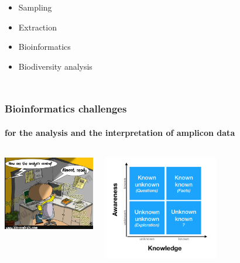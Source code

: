 \documentclass{beamer}
\begin{document}
\begin{frame}
\begin{singlespace}
\begin{columns}[onlytextwidth]
               \begin{itemize}
                  \item Sampling
                  \item Extraction
                  \item Bioinformatics
                  \item Biodiversity analysis
               \end{itemize}
               

         \end{columns}

      \end{singlespace}
   \end{frame}

   \begin{frame}
      \frametitle{Bioinformatics challenges}
      \framesubtitle{for the analysis and the interpretation of amplicon data}

      \begin{columns}[onlytextwidth]


            \includegraphics[width=40mm]{resources/bioinfo_mess.png}


            \includegraphics[width=50mm]{resources/known_unknown.png}
         
      \end{columns}
   \end{frame}


\end{document}
